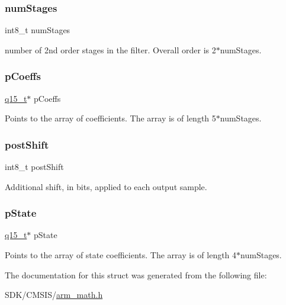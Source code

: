 \subsubsection{\texorpdfstring{num\+Stages}{numStages}}
{\footnotesize\ttfamily int8\+\_\+t num\+Stages}

number of 2nd order stages in the filter. Overall order is 2$\ast$num\+Stages. \mbox{\label{structarm__biquad__casd__df1__inst__q15_a7ca181a37f714d174445f486bebce26f}} 
\subsubsection{\texorpdfstring{p\+Coeffs}{pCoeffs}}
{\footnotesize\ttfamily \mbox{\hyperlink{arm__math_8h_ab5a8fb21a5b3b983d5f54f31614052ea}{q15\+\_\+t}}$\ast$ p\+Coeffs}

Points to the array of coefficients. The array is of length 5$\ast$num\+Stages. \mbox{\label{structarm__biquad__casd__df1__inst__q15_a3603cbf084938b6931bcb05dfe487f09}} 
\subsubsection{\texorpdfstring{post\+Shift}{postShift}}
{\footnotesize\ttfamily int8\+\_\+t post\+Shift}

Additional shift, in bits, applied to each output sample. \mbox{\label{structarm__biquad__casd__df1__inst__q15_ae29dfdb736374fcddaeaec4b7770170c}} 
\subsubsection{\texorpdfstring{p\+State}{pState}}
{\footnotesize\ttfamily \mbox{\hyperlink{arm__math_8h_ab5a8fb21a5b3b983d5f54f31614052ea}{q15\+\_\+t}}$\ast$ p\+State}

Points to the array of state coefficients. The array is of length 4$\ast$num\+Stages. 

The documentation for this struct was generated from the following file\+:\begin{DoxyCompactItemize}
\item 
S\+D\+K/\+C\+M\+S\+I\+S/\mbox{\hyperlink{arm__math_8h}{arm\+\_\+math.\+h}}\end{DoxyCompactItemize}
